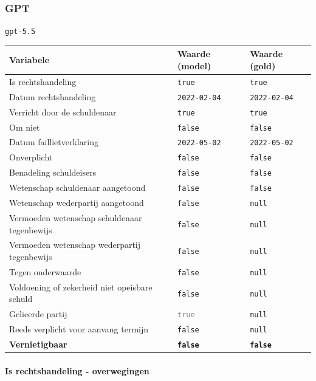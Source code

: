 \documentclass[
  dutch,
  a4paper,
]{article}
\begin{document}
\newpage


\subsubsection{GPT}\label{gpt-3}

\texttt{gpt-5.5}

\begin{center}
\small
\begin{tabular}{@{}p{7.4cm}p{2.6cm}p{2.6cm}@{}}
\toprule
Variabele & Waarde (model) & Waarde (gold) \\
\midrule
Is rechtshandeling & \texttt{true} & \texttt{true} \\
Datum rechtshandeling & \texttt{2022-02-04} & \texttt{2022-02-04} \\
Verricht door de schuldenaar & \texttt{true} & \texttt{true} \\
Om niet & \texttt{false} & \texttt{false} \\
Datum faillietverklaring & \texttt{2022-05-02} & \texttt{2022-05-02} \\
Onverplicht & \texttt{false} & \texttt{false} \\
Benadeling schuldeisers & \texttt{false} & \texttt{false} \\
Wetenschap schuldenaar aangetoond & \texttt{false} & \texttt{false} \\
Wetenschap wederpartij aangetoond & \texttt{false} & \texttt{null} \\
Vermoeden wetenschap schuldenaar tegenbewijs & \texttt{false} & \texttt{null} \\
Vermoeden wetenschap wederpartij tegenbewijs & \texttt{false} & \texttt{null} \\
Tegen onderwaarde & \texttt{false} & \texttt{null} \\
Voldoening of zekerheid niet opeisbare schuld & \texttt{false} & \texttt{null} \\
Gelieerde partij & \textcolor{gray}{\texttt{true}} & \texttt{null} \\
Reeds verplicht voor aanvang termijn & \texttt{false} & \texttt{null} \\
\textbf{Vernietigbaar} & \textbf{\texttt{false}} & \textbf{\texttt{false}} \\
\bottomrule
\end{tabular}
\end{center}

\paragraph{Is rechtshandeling - overwegingen}\label{is-rechtshandeling---overwegingen-10}
\end{document}
